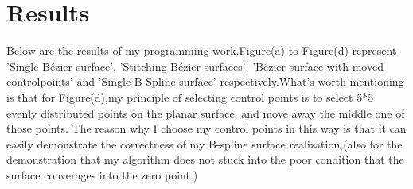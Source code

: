 \documentclass[acmtog]{acmart}
\begin{document}
\section{Results}
\qquad Below are the results of my programming work.Figure(a) to Figure(d) represent 'Single Bézier surface', 'Stitching Bézier surfaces', 'Bézier surface with moved controlpoints' and 'Single B-Spline surface' respectively.What's worth mentioning is that for Figure(d),my principle of selecting control points is to select 5*5 evenly distributed points on the planar surface, and move away the middle one of those points. The reason why I choose my control points in this way is that it can easily demonstrate the correctness of my B-spline surface realization,(also for the demonstration that my algorithm does not stuck into the poor condition that the surface converages into the zero point.)
\begin{figure}[htbp]
	\centering
	\quad
	\quad
	\quad
\end{figure}
\end{document}
